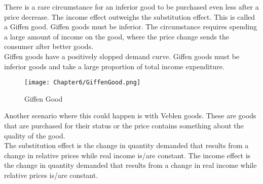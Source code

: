 There is a rare circumstance for an inferior good to be purchased even less after a price decrease.
The income effect outweighs the substitution effect. This is called a Giffen good. Giffen goods must be inferior. The circumstance
requires spending a large amount of income on the good, where the price change sends the consumer after better goods.\\
Giffen goods have a positively slopped demand curve.
Giffen goods must be inferior goods and take a large proportion of total income expenditure.
\begin{figure}[H]
    \centering
    \texttt{[image: Chapter6/GiffenGood.png]}
    \caption{Giffen Good}
    \label{fig:Giffen_Good}
\end{figure}\par
Another scenario where this could happen is with Veblen goods. These are goods that are purchased for their status or the 
price contains something about the quality of the good.\\
The substitution effect is the change in quantity demanded that results from a change in 
relative prices while real income is/are constant. 
The income effect is the change in quantity demanded that results from a change in real income while  relative prices is/are constant.